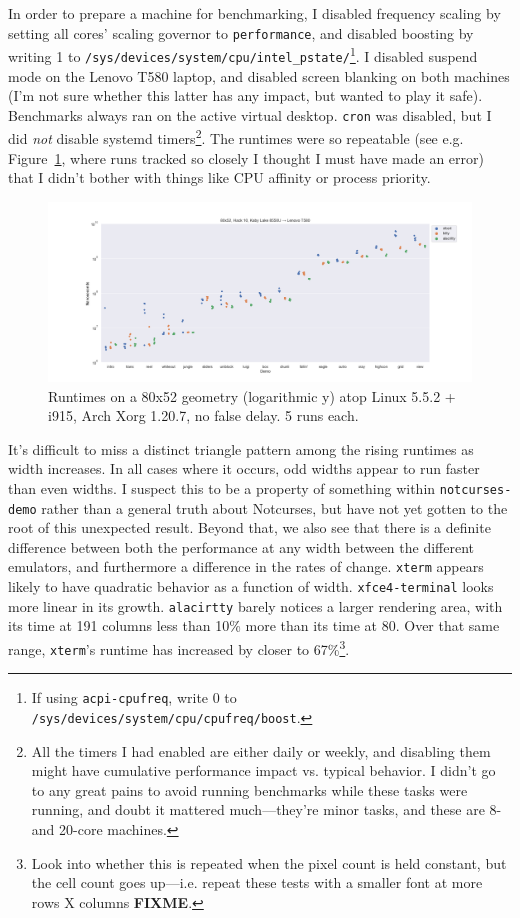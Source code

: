 In order to prepare a machine for benchmarking, I disabled frequency scaling
by setting all cores' scaling governor to \texttt{performance}, and disabled
boosting by writing 1 to \texttt{/sys/devices/system/cpu/intel\_pstate/}\footnote{If using \texttt{acpi-cpufreq}, write 0 to \texttt{/sys/devices/system/cpu/cpufreq/boost}.}.
I disabled suspend mode on the Lenovo T580 laptop, and disabled screen blanking
on both machines (I'm not sure whether this latter has any impact, but wanted
to play it safe). Benchmarks always ran on the active virtual desktop. \texttt{cron} was
disabled, but I did \textit{not} disable systemd timers\footnote{All the timers I
had enabled are either daily or weekly, and disabling them might have
cumulative performance impact vs. typical behavior. I didn't go to any great
pains to avoid running benchmarks while these tasks were running, and doubt it
mattered much---they're minor tasks, and these are 8- and 20-core machines.}.
The runtimes were so repeatable (see e.g. Figure~\ref{fig:intel-full}, where
runs tracked so closely I thought I must have made an error) that I didn't
bother with things like CPU affinity or process priority.

\begin{figure}[!htb]
\centering
\includegraphics[width=1\textwidth]{media/i915-80x52.png}
\caption[80x52 Intel i7-8550U benchmarks.]{Runtimes on a 80x52 geometry (logarithmic y) atop Linux 5.5.2 + i915, Arch Xorg 1.20.7, no false delay. 5 runs each.}
\label{fig:intel-full}
\end{figure}

It's difficult to miss a distinct triangle pattern among the rising runtimes
as width increases. In all cases where it occurs, odd widths appear to run
faster than even widths. I suspect this to be a property of something within
\texttt{notcurses-demo} rather than a general truth about Notcurses, but have
not yet gotten to the root of this unexpected result. Beyond that, we also see
that there is a definite difference between both the performance at any width
between the different emulators, and furthermore a difference in the rates of
change. \texttt{xterm} appears likely to have quadratic behavior as a function
of width. \texttt{xfce4-terminal} looks more linear in its growth. \texttt{alacirtty}
barely notices a larger rendering area, with its time at 191 columns less than
10\% more than its time at 80. Over that same range, \texttt{xterm}'s runtime
has increased by closer to 67\%\footnote{Look into whether this is repeated when
the pixel count is held constant, but the cell count goes up---i.e. repeat these
tests with a smaller font at more rows X columns \textbf{FIXME}.}.


